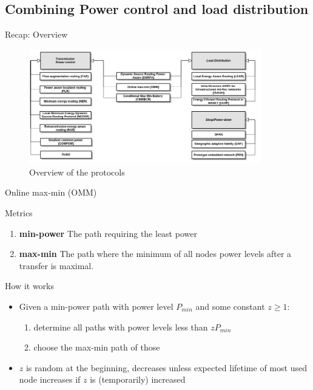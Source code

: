 \documentclass{beamer}
\begin{document}
\subsection{Combining Power control and load distribution}
\begin{frame}{Recap: Overview}
\begin{figure}
  \centering
  \includegraphics[width=0.9\textwidth]{images/overview}
  \caption{Overview of the protocols}
  
\end{figure}
\end{frame}
\begin{frame}{Online max-min (OMM)\cite{li2001online}}
\begin{block}{Metrics}
    \begin{enumerate}
        \item \textbf{min-power} The path requiring the least power
        \item \textbf{max-min} The path where the minimum of all nodes power levels after a transfer is maximal.
    \end{enumerate}
\end{block}

\begin{block}{How it works}
    \begin{itemize}
        \item Given a min-power path with power level $P_{min}$ and some constant $z \ge 1$:
         \begin{enumerate}
             \item  determine all paths with power levels less than $zP_{min}$
             \item choose the max-min path of those
         \end{enumerate}
        \item $z$ is random at the beginning, decreases unless expected lifetime of most used node increases if $z$ is (temporarily) increased
    \end{itemize}
\end{block}
\end{frame}
\end{document}

